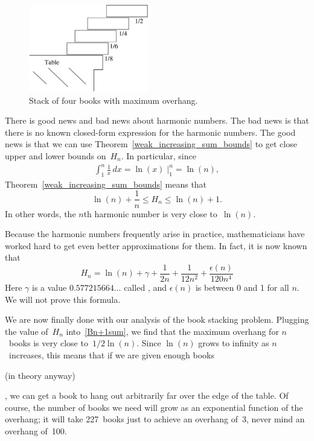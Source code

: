 \begin{figure}[htbp]
\centerline{\includegraphics[height=1.5in]{figures/drafts/optstack}}
\caption{Stack of four books with maximum overhang.}
\label{fig:optstack}
\end{figure}

There is good news and bad news about harmonic numbers.  The bad news
is that there is no known closed-form expression for the harmonic
numbers.  The good news is that we can use
Theorem~\ref{weak_increasing_sum_bounds} to get close upper and lower
bounds on~$H_n$.  In particular, since
\begin{align*}
\int_1^n \frac{1}{x} \, dx
    = \ln(x) \; \Bigr|_1^n %
    = \ln(n),
\end{align*}
Theorem~\ref{weak_increasing_sum_bounds} means that
\begin{equation}\label{eqn:9G30}
    \ln(n) + \frac{1}{n} \le H_n \le \ln(n) + 1.
\end{equation}
In other words, the $n$th harmonic number is very close to~$\ln(n)$.

Because the harmonic numbers frequently arise in practice,
mathematicians have worked hard to get even better approximations for
them.  In fact, it is now known that
\begin{equation}\label{eqn:9K2}
    H_n = \ln(n) + \gamma + \frac{1}{2n} + \frac{1}{12n^2} +
        \frac{\epsilon(n)}{120n^4}
\end{equation}
Here $\gamma$ is a value $0.577215664\dots$ called , and $\epsilon(n)$ is between 0 and 1 for all $n$.  We
will not prove this formula.

We are now finally done with our analysis of the book stacking
problem.  Plugging the value of~$H_n$ into~\eqref{Bn+1sum}, we
find that the maximum overhang for $n$~books is very close
to~$1/2\ln(n)$.  Since $\ln(n)$ grows to infinity as $n$~increases,
this means that if we are given enough books \begin{editingnotes}
(in theory anyway)
\end{editingnotes}, we
can get a book to hang out arbitrarily far over the edge of the table.
Of course, the number of books we need will grow as an exponential
function of the overhang; it will take 227~books just to achieve an
overhang of~3, never mind an overhang of~100.

